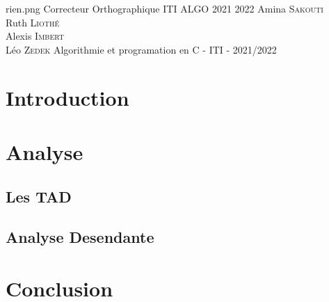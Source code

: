 \documentclass[11pt,a4paper]{article}
\begin{document}
\PageDeGarde	
{rien.png} %
{Correcteur Orthographique} %
{ITI ALGO 2021 2022} %
{Amina \textsc{Sakouti}\\Ruth \textsc{Liothé}\\ Alexis \textsc{Imbert} \\Léo \textsc{Zedek}} %
{Algorithmie et programation en C - ITI - 2021/2022} %



\tableofcontents
\newpage

\section*{Introduction}

\section{Analyse}
\subsection{Les TAD}

\subsection{Analyse Desendante}


\section*{Conclusion}
\end{document}
